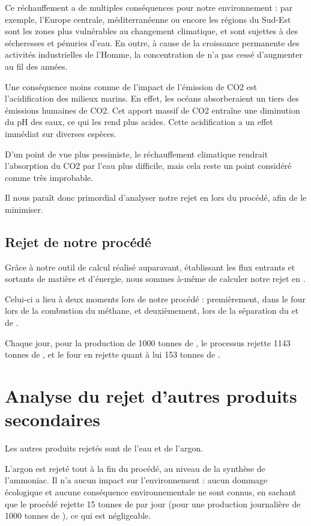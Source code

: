 \documentclass[a4paper, oneside]{scrartcl}
\begin{document}
Ce réchauffement a de multiples conséquences pour notre environnement : par exemple, l'Europe centrale, méditerranéenne ou encore les régions du Sud-Est sont les zones plus vulnérables au changement climatique, et sont sujettes à des sécheresses et pénuries d'eau. En outre, à cause de la croissance permanente des activités industrielles de l'Homme, la concentration de  n'a pas cessé d'augmenter au fil des années.
 

Une conséquence moins connue de l’impact de l’émission de CO2 est l’acidification des milieux marins. En effet, les océans absorberaient un tiers des émissions humaines de CO2. Cet apport massif de CO2 entraîne une diminution du pH des eaux, ce qui les rend plus acides. Cette acidification a un effet immédiat sur diverses espèces.

D’un point de vue plus pessimiste, le réchauffement climatique rendrait l’absorption du CO2 par l’eau plus difficile, mais cela reste un point considéré comme très improbable.
 

Il nous paraît donc primordial d'analyser notre rejet en  lors du procédé, afin de le minimiser.

\subsection{Rejet de notre procédé}
Grâce à notre outil de calcul réalisé auparavant, établissant les flux entrants et sortants de matière et d'énergie, nous sommes à-même de calculer notre rejet en .

Celui-ci a lieu à deux moments lors de notre procédé : premièrement, dans le four lors de la combustion du méthane, et deuxièmement, lors de la séparation du  et de .

Chaque jour, pour la production de 1000 tonnes de , le processus rejette 1143 tonnes de , et le four en rejette quant à lui 153 tonnes de .

\section{Analyse du rejet d'autres produits secondaires}
Les autres produits rejetés sont de l'eau et de l'argon.
 

L'argon est rejeté tout à la fin du procédé, au niveau de la synthèse de l'ammoniac. Il n'a aucun impact sur l'environnement : aucun dommage écologique et aucune conséquence environnementale ne sont connus, en sachant que le procédé rejette 15 tonnes de  par jour (pour une production journalière de 1000 tonnes de ), ce qui est négligeable.
 
\end{document}
